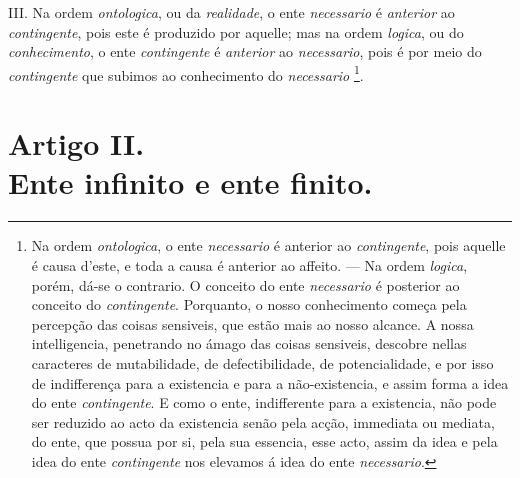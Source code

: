  III. Na ordem \emph{ontologica}, ou da \emph{realidade}, o ente \emph{necessario} é \emph{anterior} ao \emph{contingente}, pois este é produzido por aquelle; mas na ordem \emph{logica}, ou do \emph{conhecimento}, o ente \emph{contingente} é \emph{anterior} ao \emph{necessario}, pois é por meio do \emph{contingente} que subimos ao conhecimento do \emph{necessario} \footnote{Na ordem \emph{ontologica}, o ente \emph{necessario} é anterior ao \emph{contingente}, pois aquelle é causa d'este, e toda a causa é anterior ao affeito. --- Na ordem \emph{logica}, porém, dá-se o contrario. O conceito do ente \emph{necessario} é posterior ao conceito do \emph{contingente}. Porquanto, o nosso conhecimento começa pela percepção das coisas sensiveis, que estão mais ao nosso alcance. A nossa intelligencia, penetrando no ámago das coisas sensiveis, descobre nellas caracteres de mutabilidade, de defectibilidade, de potencialidade, e por isso de indifferença para a existencia e para a não-existencia, e assim forma a idea do ente \emph{contingente}. E como o ente, indifferente para a existencia, não pode ser reduzido ao acto da existencia senão pela acção, immediata ou mediata, do ente, que possua por si, pela sua essencia, esse acto, assim da idea e pela idea do ente \emph{contingente} nos elevamos á idea do ente \emph{necessario}.}.


\section*{Artigo II.\\ Ente infinito e ente finito.}

